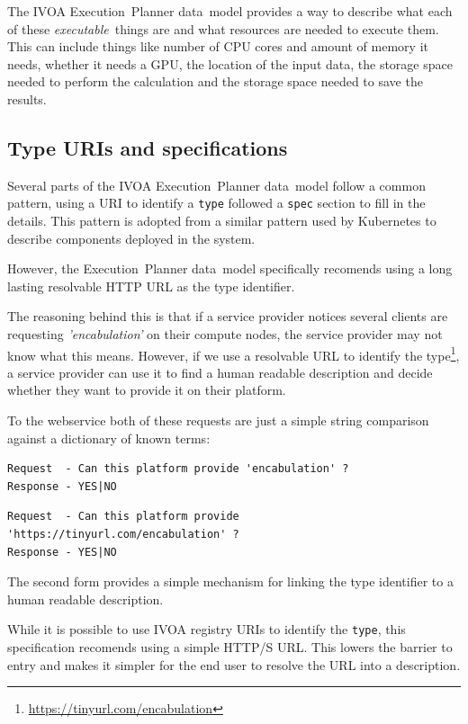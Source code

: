 \documentclass[11pt,a4paper]{ivoa}
\newcommand{\datamodel} {data~model}
\newcommand{\webservice} {webservice}
\newcommand{\ivoa} {IVOA}
\newcommand{\executionplanner} {Execution~Planner}
\newcommand{\kubernetes} {Kubernetes}
\newcommand{\codeword}[1] {\texttt{#1}}
\newcommand{\footurl}[1] {\footnote{\url{#1}}}
\newcommand{\executablething} {\textit{executable}~thing}
\newcommand{\cpu} {CPU}
\newcommand{\gpu} {GPU}
\begin{document}
The \ivoa{} \executionplanner{} \datamodel{} provides a way to describe what each of these \executablething{}s
are and what resources are needed to execute them.
This can include things like number of \cpu{} cores and amount of memory it needs,
whether it needs a \gpu{}, the location of the input data, the storage space needed to perform
the calculation and the storage space needed to save the results.

\subsection{Type URIs and specifications}
\label{type-and-spec}

Several parts of the \ivoa{} \executionplanner{} \datamodel{} follow a common pattern, using a URI
to identify a \codeword{type} followed a \codeword{spec} section to fill in the details.
This pattern is adopted from a similar pattern used by \kubernetes{} to describe components
deployed in the system.

However, the \executionplanner{} \datamodel{} specifically recomends using a long lasting resolvable
HTTP URL as the type identifier.

The reasoning behind this is that if a service provider notices several clients are requesting
\textit{'encabulation'} on their compute nodes, the service provider may not know what this means.
However, if we use a resolvable URL to identify the type\footurl{https://tinyurl.com/encabulation},
a service provider can use it to find a human readable description and decide whether they want
to provide it on their platform.

To the \webservice{} both of these requests are just a simple string comparison against a
dictionary of known terms:

\begin{lstlisting}[]
Request  - Can this platform provide 'encabulation' ?
Response - YES|NO
\end{lstlisting}

\begin{lstlisting}[]
Request  - Can this platform provide 'https://tinyurl.com/encabulation' ?
Response - YES|NO
\end{lstlisting}

The second form provides a simple mechanism for linking the type identifier to a human readable description.

While it is possible to use \ivoa{} registry URIs to identify the \codeword{type}, this specification
recomends using a simple HTTP/S URL. This lowers the barrier to entry and makes it simpler for the end user
to resolve the URL into a description.
\end{document}
